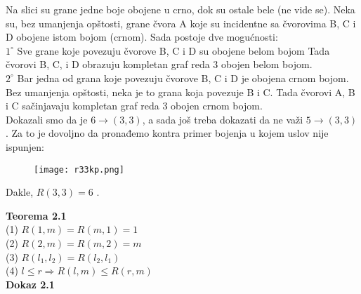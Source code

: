 \documentclass[12pt,a4paper]{article}
\begin{document}
	\noindent Na slici su grane jedne boje obojene u crno, dok su ostale bele (ne vide se).
	Neka su, bez umanjenja opštosti, grane čvora A koje su incidentne sa čvorovima B, C i D obojene istom bojom (crnom). Sada postoje dve mogućnosti: 
	\vspace{1em}
	\\
	$1^\circ$ Sve grane koje povezuju čvorove B, C i D su obojene belom bojom Tada čvorovi B, C, i D obrazuju kompletan graf reda 3 obojen belom bojom.
	\vspace{0.5em}
	\\
	$2^\circ$ Bar jedna od grana koje povezuju čvorove B, C i D je obojena crnom bojom. Bez umanjenja opštosti, neka je to grana koja povezuje B i C. Tada čvorovi A, B i C sačinjavaju kompletan graf reda 3 obojen crnom bojom.
	\vspace{0.5em}
	\\Dokazali smo da je $6 \rightarrow (3, 3)$, a sada još treba dokazati da ne važi $5 \rightarrow (3, 3)$. Za to je dovoljno da pronađemo kontra primer bojenja u kojem uslov nije ispunjen:
	\begin{figure}[h]
	\centering
	\texttt{[image: r33kp.png]}
	\end{figure}
	
	Dakle, $R(3,3)=6$ .	
	
	\newpage
	
	{\noindent\fontsize{12pt}{12pt}\textbf{Teorema 2.1}}
	\vspace{0.5em}	
	\\
	(1) {} {} $R(1, m) = R(m, 1) = 1$\\
	(2) {} {} $R(2, m) = R(m, 2) = m$\\
	(3) {} {} $R(l_{1}, l_{2}) = R(l_{2}, l_{1})$\\
	(4) {} {} $l \leq r \Rightarrow R(l, m) \leq R(r, m)$\\
	
	{\noindent\fontsize{12pt}{12pt}\textbf{Dokaz 2.1}}
	
	\vspace{0.5em}
	
\end{document}
